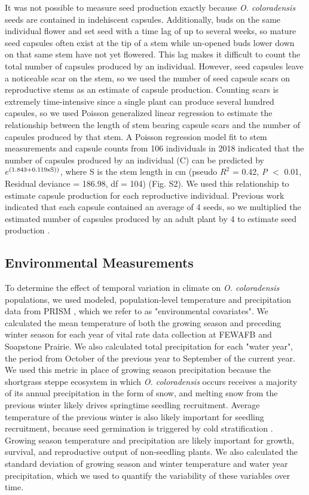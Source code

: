 \documentclass[12pt, letterpaper]{article}
\begin{document}
It was not possible to measure seed production exactly because \textit{O. coloradensis} seeds are contained in indehiscent capsules. Additionally, buds on the same individual flower and set seed with a time lag of up to several weeks, so mature seed capsules often exist at the tip of a stem while un-opened buds lower down on that same stem have not yet flowered. This lag makes it difficult to count the total number of capsules produced by an individual. However, seed capsules leave a noticeable scar on the stem, so we used the number of seed capsule scars on reproductive stems as an estimate of capsule production. Counting scars is extremely time-intensive since a single plant can produce several hundred capsules, so we used Poisson generalized linear regression to estimate the relationship between the length of stem bearing capsule scars and the number of capsules produced by that stem. A Poisson regression model fit to stem measurements and capsule counts from 106 individuals in 2018 indicated that the number of capsules produced by an individual (C) can be predicted by $e^{(1.843 + 0.119\text{\textsf{x}}\text{S}))}$, where S is the stem length in cm (pseudo $R^2$ = 0.42, \textit{P} $<$ 0.01, Residual deviance = 186.98, df = 104) (Fig. S2). We used this relationship to estimate capsule production for each reproductive individual. Previous work indicated that each capsule contained an average of 4 seeds, so we multiplied the estimated number of capsules produced by an adult plant by 4 to estimate seed production \cite{Burgess2005CapsuleColoradensis}. 

\subsection{Environmental Measurements}
To determine the effect of temporal variation in climate on \textit{O. coloradensis} populations, we used modeled, population-level temperature and precipitation data from PRISM \cite{PRISMClimateGroupOregonStateUniversity2021PRISMUniversity}, which we refer to as "environmental covariates". We calculated the mean temperature of both the growing season and preceding winter season for each year of vital rate data collection at FEWAFB and Soapstone Prairie. We also calculated total precipitation for each "water year", the period from October of the previous year to September of the current year. We used this metric in place of growing season precipitation because the shortgrass steppe ecosystem in which \textit{O. coloradensis} occurs receives a majority of its annual precipitation in the form of snow, and melting snow from the previous winter likely drives springtime seedling recruitment. Average temperature of the previous winter is also likely important for seedling recruitment, because seed germination is triggered by cold stratification \cite{Burgess2005CapsuleColoradensis}. Growing season temperature and precipitation are likely important for growth, survival, and reproductive output of non-seedling plants. We also calculated the standard deviation of growing season and winter temperature and water year precipitation, which we used to quantify the variability of these variables over time. 
\end{document}
